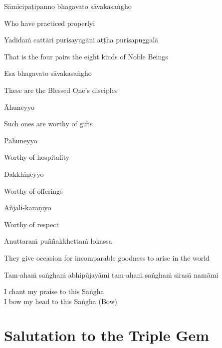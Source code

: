 Sāmīcipaṭipanno bhagavato sāvakasaṅgho

\begin{english}
  Who have practiced properlyi
\end{english}

Yadidaṁ cattāri purisayugāni aṭṭha purisapuggalā

\begin{english}
  That is the four pairs the eight kinds of Noble Beings
\end{english}

Esa bhagavato sāvakasaṅgho

\begin{english}
  These are the Blessed One’s disciples
\end{english}

Āhuneyyo

\begin{english}
  Such ones are worthy of gifts
\end{english}

Pāhuneyyo

\begin{english}
  Worthy of hospitality
\end{english}

Dakkhiṇeyyo

\begin{english}
  Worthy of offerings
\end{english}

Añjali-karaṇīyo

\begin{english}
  Worthy of respect
\end{english}

Anuttaraṁ puññakkhettaṁ lokassa

\begin{english}
  They give occasion for incomparable goodness to arise in the world
\end{english}

\begin{pali-hang}
Tam-ahaṁ saṅghaṁ abhipūjayāmi tam-ahaṁ saṅghaṁ sirasā namāmi
\end{pali-hang}

\begin{english}
  I chant my praise to this Saṅgha\\
  I bow my head to this Saṅgha \hfill{(Bow)}
\end{english}

\section{Salutation to the Triple Gem}
\label{salutation}

